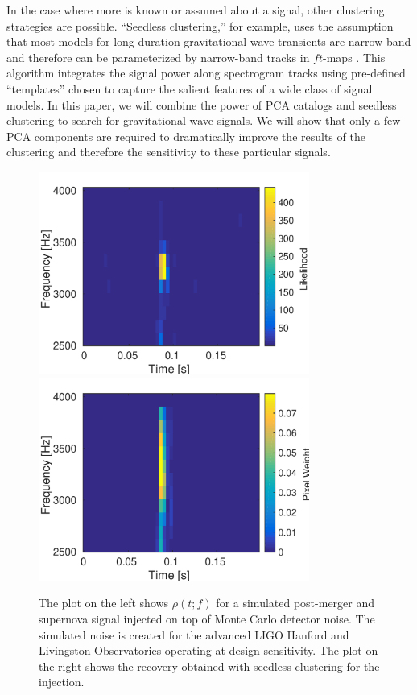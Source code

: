 \documentclass[prd,showpacs,superscriptaddress,twocolumn,
floatfix,preprintnumbers,altaffilletter]{revtex4}
\begin{document}
In the case where more is known or assumed about a signal, other clustering strategies are possible. ``Seedless clustering,'' for example, uses the assumption that most models for long-duration gravitational-wave transients are narrow-band and therefore can be parameterized by narrow-band tracks in $ft$-maps \cite{ThCo2013,ThCo2014,CoTh2014,CoMe2015,CoMe2015b,ThCo2015}.
This algorithm integrates the signal power along spectrogram tracks using pre-defined ``templates'' chosen to capture the salient features of a wide class of signal models.
In this paper, we will combine the power of PCA catalogs and seedless clustering to search for gravitational-wave signals.
We will show that only a few PCA components are required to dramatically improve the results of the clustering and therefore the sensitivity to these particular signals.

\begin{figure}[t]
 \includegraphics[width=3.5in]{map_PMNS.pdf}
 \includegraphics[width=3.5in]{rmap_H_PMNS.pdf} 
 \caption{
   The plot on the left shows $\rho(t;f)$ for a simulated post-merger and supernova signal injected on top of Monte Carlo detector noise.
   The simulated noise is created for the advanced LIGO Hanford and Livingston Observatories operating at design sensitivity.
   The plot on the right shows the recovery obtained with seedless clustering for the injection.
 }
 \label{fig:SNR}
\end{figure}
\end{document}
